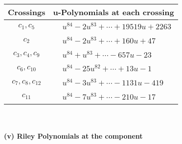 \documentclass[1p]{elsarticle_modified}
\theoremstyle{definition}
\begin{document}
\begin{tabular}{m{50pt}|m{274pt}}
Crossings & \hspace{64pt}u-Polynomials at each crossing \\
\hline $$\begin{aligned}c_{1},c_{5}\end{aligned}$$&$\begin{aligned}
&u^{84}-2 u^{83}+\cdots+19519 u+2263
\end{aligned}$\\
\hline $$\begin{aligned}c_{2}\end{aligned}$$&$\begin{aligned}
&u^{84}-2 u^{83}+\cdots+160 u+47
\end{aligned}$\\
\hline $$\begin{aligned}c_{3},c_{4},c_{9}\end{aligned}$$&$\begin{aligned}
&u^{84}+u^{83}+\cdots-657 u-23
\end{aligned}$\\
\hline $$\begin{aligned}c_{6},c_{10}\end{aligned}$$&$\begin{aligned}
&u^{84}-25 u^{82}+\cdots+13 u-1
\end{aligned}$\\
\hline $$\begin{aligned}c_{7},c_{8},c_{12}\end{aligned}$$&$\begin{aligned}
&u^{84}-3 u^{83}+\cdots-1131 u-419
\end{aligned}$\\
\hline $$\begin{aligned}c_{11}\end{aligned}$$&$\begin{aligned}
&u^{84}-7 u^{83}+\cdots-210 u-17
\end{aligned}$\\
\hline
\end{tabular}\\~\\
\newpage\renewcommand{\arraystretch}{1}
\flushleft \textbf{(v) Riley Polynomials at the component}\newline \\
\end{document}
